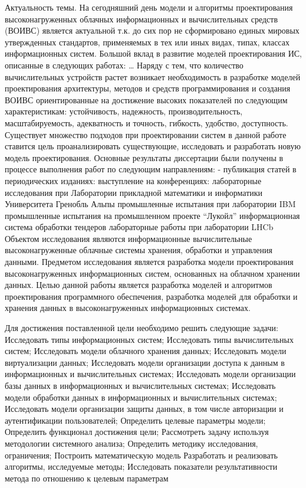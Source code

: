 
{\actuality} 
Актуальность темы. На сегодняшний день модели и алгоритмы проектирования высоконагруженных облачных информационных и вычислительных средств (ВОИВС) является актуальной т.к. до сих пор не сформировано единых мировых утвержденных стандартов, применяемых в тех или иных видах, типах, классах информационных систем. Большой вклад в развитие моделей проектирования ИС, описанные в следующих работах:
…
Наряду с тем, что количество вычислительных устройств растет возникает необходимость в разработке моделей проектирования архитектуры, методов и средств программирования и создания ВОИВС ориентированные на достижение высоких показателей по следующим характеристикам: устойчивость, надежность, производительность, масштабируемость, адекватность и точность, гибкость, удобство, доступность.
Существует множество подходов при проектировании систем в данной работе ставится цель проанализировать существующие, исследовать и разработать новую модель проектирования. 
Основные результаты диссертации были получены в процессе выполнения работ по следующим направлениям:
- публикация статей в периодических изданиях:
выступление на конференциях:
лабораторные исследования при Лаборатории прикладной математики и информатики Университета Гренобль Альпы
промышленные испытания при лаборатории IBM
промышленные испытания на промышленном проекте “Лукойл” информационная система обработки тендеров
лабораторные работы при лаборатории LHCb 
Объектом исследования являются информационные вычислительные высоконагруженные облачные системы хранения, обработки и управления данными.
Предметом исследования является разработка модели проектирования высоконагруженных информационных систем, основанных на облачном хранении данных.
Целью данной работы является разработка моделей и алгоритмов проектирования программного обеспечения, разработка моделей для обработки и хранения данных в высоконагруженных информационных системах.

Для достижения поставленной цели необходимо решить следующие задачи:
Исследовать типы информационных систем;
Исследовать типы вычислительных систем;
Исследовать модели облачного хранения данных;
Исследовать модели виртуализации данных;
Исследовать модели организации доступа к данным в информационных и вычислительных системах;
Исследовать модели организации базы данных в информационных и вычислительных системах;
Исследовать модели обработки данных в информационных и вычислительных системах;
Исследовать модели организации защиты данных, в том числе авторизации и аутентификации пользователей;
Определить целевые параметры модели;
Определить функционал достижения цели;
Рассмотреть задачу используя методологии системного анализа;
Определить методику исследования, ограничения;
Построить математическую модель
Разработать и реализовать алгоритмы, исследуемые методы;
Исследовать показатели результативности метода по отношению к целевым параметрам

